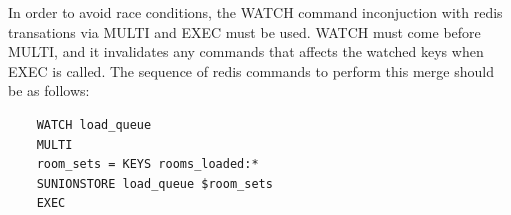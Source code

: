 In order to avoid race conditions, the WATCH command inconjuction with redis transations via MULTI and EXEC\cite{redis-transactions} must be used. WATCH must come before MULTI, and it invalidates any commands that affects the watched keys when EXEC is called. The sequence of redis commands to perform this merge should be as follows:

\begin{verbatim}
	WATCH load_queue
	MULTI
	room_sets = KEYS rooms_loaded:*
	SUNIONSTORE load_queue $room_sets
	EXEC
\end{verbatim}